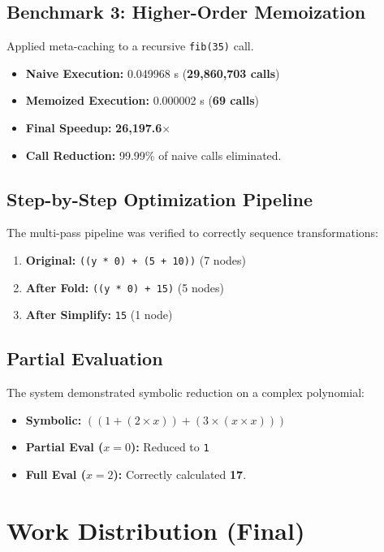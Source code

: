 \documentclass[12pt]{article}
\begin{document}
\subsection{Benchmark 3: Higher-Order Memoization}
Applied meta-caching to a recursive \texttt{fib(35)} call.
\begin{itemize}
    \item \textbf{Naive Execution:} 0.049968 s (\textbf{29,860,703 calls})
    \item \textbf{Memoized Execution:} 0.000002 s (\textbf{69 calls})
    \item \textbf{Final Speedup:} \textbf{26,197.6$\times$}
    \item \textbf{Call Reduction:} 99.99\% of naive calls eliminated.
\end{itemize}

\subsection{Step-by-Step Optimization Pipeline}
The multi-pass pipeline was verified to correctly sequence transformations:
\begin{enumerate}
    \item \textbf{Original:} \texttt{((y * 0) + (5 + 10))} (7 nodes)
    \item \textbf{After Fold:} \texttt{((y * 0) + 15)} (5 nodes)
    \item \textbf{After Simplify:} \texttt{15} (1 node)
\end{enumerate}

\subsection{Partial Evaluation}
The system demonstrated symbolic reduction on a complex polynomial:
\begin{itemize}
    \item \textbf{Symbolic:} $((1 + (2 \times x)) + (3 \times (x \times x)))$
    \item \textbf{Partial Eval ($x=0$):} Reduced to \texttt{1}
    \item \textbf{Full Eval ($x=2$):} Correctly calculated \textbf{17}.
\end{itemize}

\section{Work Distribution (Final)}
\end{document}
